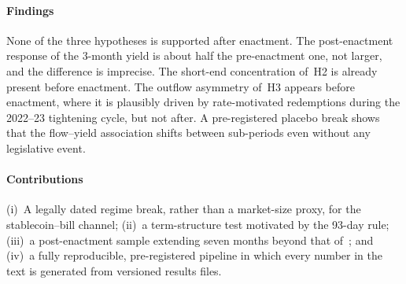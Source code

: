 \paragraph*{Findings} None of the three hypotheses is supported after enactment. The post-enactment response of the 3-month yield is about half the pre-enactment one, not larger, and the difference is imprecise. The short-end concentration of~H2 is already present before enactment. The outflow asymmetry of~H3 appears before enactment, where it is plausibly driven by rate-motivated redemptions during the 2022--23 tightening cycle, but not after. A pre-registered placebo break shows that the flow--yield association shifts between sub-periods even without any legislative event.

\paragraph*{Contributions} (i)~A legally dated regime break, rather than a market-size proxy, for the stablecoin--bill channel; (ii)~a term-structure test motivated by the 93-day rule; (iii)~a post-enactment sample extending seven months beyond that of~\cite{ahmed2025}; and (iv)~a fully reproducible, pre-registered pipeline in which every number in the text is generated from versioned results files.
